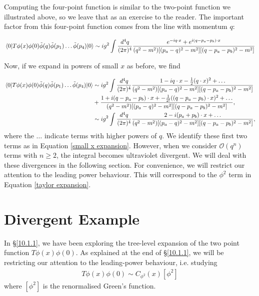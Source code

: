 \documentclass{article}
\begin{document}
Computing the four-point function is similar to the two-point function we illustrated above, so we leave that as an exercise to the reader. The important factor from this four-point function comes from the line with momentum $q$:

\begin{equation}
    \mel{0}{T\phi(x)\phi(0)\Tilde{\phi}(q)\Tilde{\phi}(p_1)\dots\Tilde{\phi}(p_4)}{0} \sim ig^2\int \frac{d^4q}{(2\pi)^4}\frac{e^{-iq\cdot x}+e^{i(q-p_a-p_b)\cdot x}}{(q^2-m^2)[(p_a-q)^2-m^2][(q-p_a-p_b)^2-m^2]}
\end{equation}

Now, if we expand in powers of small $x$ as before, we find 

\begin{equation}
    \begin{split}
        \mel{0}{T\phi(x)\phi(0)\Tilde{\phi}(q)\Tilde{\phi}(p_1)\dots\Tilde{\phi}(p_4)}{0} &\sim ig^2\int \frac{d^4q}{(2\pi)^4}\frac{1-iq\cdot x -\frac{1}{2}(q\cdot x)^2+\dots}{(q^2-m^2)[(p_a-q)^2-m^2][(q-p_a-p_b)^2-m^2]}\\
        &+ \frac{1+i(q-p_a-p_b)\cdot x+ -\frac{1}{2!}((q-p_a-p_b)\cdot x)^2+\dots}{(q^2-m^2)[(p_a-q)^2-m^2][(q-p_a-p_b)^2-m^2]},\\
        &\sim ig^2\int \frac{d^4q}{(2\pi)^4}\frac{2 - i(p_a+p_b)\cdot x +\dots}{(q^2-m^2)[(p_a-q)^2-m^2][(q-p_a-p_b)^2-m^2]},
    \end{split}
\end{equation}
where the $\dots$ indicate terms with higher powers of $q$. We identify these first two terms as in Equation \ref{small x expansion}. However, when we consider $\mathcal{O}(q^n)$ terms with $n\geq 2$, the integral becomes ultraviolet divergent.  We will deal with these divergences in the following section. For convenience, we will restrict our attention to the leading power behaviour. This will correspond to the $\phi^2$ term in Equation \ref{taylor expansion}. 

\section{Divergent Example}\label{10.1.2}
In \S\ref{10.1.1}, we have been exploring the tree-level expansion of the two point function $T\phi(x)\phi(0)$. As explained at the end of \S\ref{10.1.1}, we will be restricting our attention to the leading-power behaviour, i.e. studying
\begin{align*}
    T\phi(x)\phi(0) \sim C_{\phi^2}(x)[\phi^2]
\end{align*}
where $[\phi^2]$ is the renormalised Green's function. \\
\end{document}
